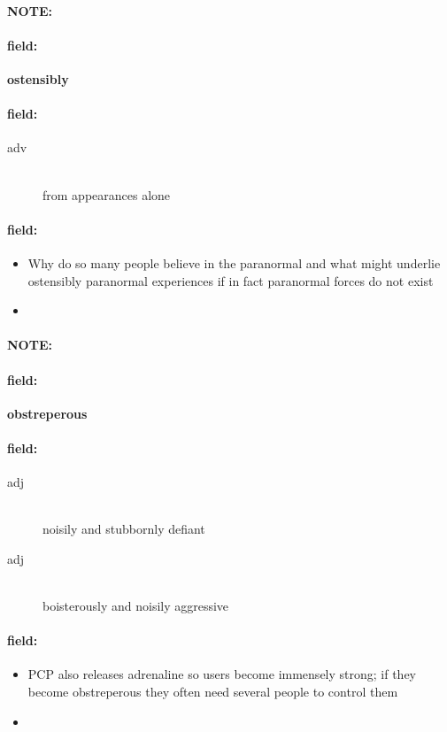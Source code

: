 \documentclass[12pt]{article}
\newenvironment{note}{\paragraph{NOTE:}}{}
\newenvironment{field}{\paragraph{field:}}{}
\begin{document}
\begin{note}
\begin{field}
\textbf{\large ostensibly}
\end{field}


\begin{field}
\begin{description}
\item[adv] \hfill \\ 
from appearances alone

\end{description}
\end{field}

\begin{field}
\begin{itemize}
\item Why do so many people believe in the paranormal and what might underlie ostensibly paranormal experiences if in fact paranormal forces do not exist
\item 
\end{itemize}
\end{field}
\end{note}
\begin{note}
\begin{field}
\textbf{\large obstreperous}
\end{field}


\begin{field}
\begin{description}
\item[adj] \hfill \\ 
noisily and stubbornly defiant

\item[adj] \hfill \\ 
boisterously and noisily aggressive

\end{description}
\end{field}

\begin{field}
\begin{itemize}
\item PCP also releases adrenaline so users become immensely strong; if they become obstreperous they often need several people to control them
\item 
\end{itemize}
\end{field}
\end{note}
\end{document}
